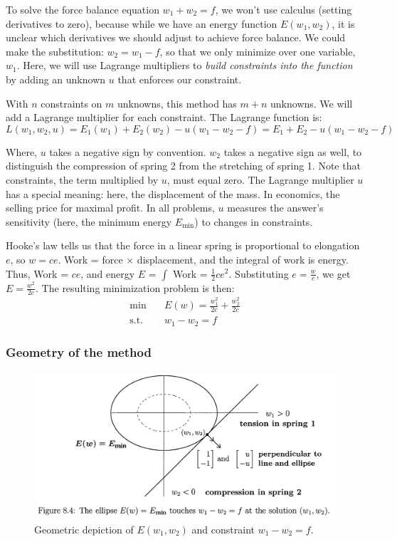 \documentclass[]{article}
\begin{document}
To solve the force balance equation $w_1 + w_2 = f$, we won't use calculus (setting derivatives to zero), because while we have an energy function $E(w_1 , w_2)$, it is unclear which derivatives we should adjust to achieve force balance. We could make the substitution: $w_2 = w_1 - f$, so that we only minimize over one variable, $w_1$. Here, we will use Lagrange multipliers to \textit{build constraints into the function} by adding an unknown $u$ that enforces our constraint. 

With $n$ constraints on $m$ unknowns, this method has $m + n$ unknowns. We will add a Lagrange multiplier for each constraint. The Lagrange function is:
\begin{equation}
L(w_1, w_2, u) = E_1 (w_1) + E_2 (w_2) - u(w_1 - w_2 - f) = E_1 + E_2 - u (w_1 - w_2 - f)
\end{equation}

Where, $u$ takes a negative sign by convention. $w_2$ takes a negative sign as well, to distinguish the compression of spring 2 from the stretching of spring 1. Note that constraints, the term multiplied by $u$, must equal zero. The Lagrange multiplier $u$ has a special meaning: here, the displacement of the mass. In economics, the selling price for maximal profit. In all problems, $u$ measures the answer's sensitivity (here, the minimum energy $E_{\textrm{min}}$) to changes in constraints. 

Hooke's law tells us that the force in a linear spring is proportional to elongation $e$, so $w = ce$. Work = force $\times$ displacement, and the integral of work is energy. Thus, Work = $ce$, and energy $E$ = $\int$ Work = $\frac{1}{2} ce^2$. Substituting $e = \frac{w}{c}$, we get $E = \frac{w^2}{2c}$. The resulting minimization problem is then:
\begin{align}
\min &\quad E(w) = \frac{w_{1}^2}{2c} + \frac{w_{2}^2}{2c} \\
\textrm{s.t. } &\quad w_1 - w_2 = f \nonumber 
\end{align}

\subsubsection{Geometry of the method}
\begin{figure}[H]
	\centering
	\includegraphics[width=0.9\linewidth]{figs/Strang_constrained_geo}
	\caption{Geometric depiction of $E(w_1, w_2)$ and constraint $w_1 - w_2 = f$.}
	\label{fig:strangconstrainedgeo}
\end{figure}
\end{document}

